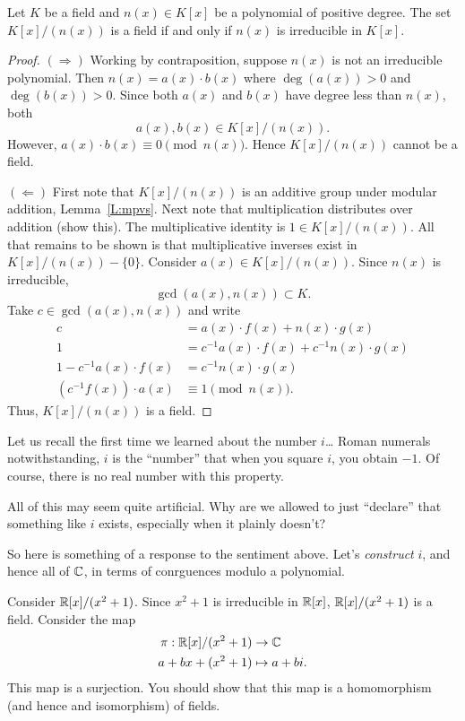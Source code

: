 \documentclass{ximera}
\begin{document}
\begin{theorem}\label{T:cmip}
  Let $K$ be a field and $n(x)\in K[x]$ be a polynomial of positive
  degree. The set $K[x]/(n(x))$ is a field if and only if $n(x)$ is
  irreducible in $K[x]$.
  \begin{proof}
    $(\Rightarrow)$ Working by contraposition, suppose $n(x)$ is not
    an irreducible polynomial. Then $n(x) = a(x)\cdot b(x)$ where
    $\deg(a(x))>0$ and $\deg(b(x))>0$. Since both $a(x)$ and $b(x)$
    have degree less than $n(x)$, both
    \[
    a(x),b(x)\in K[x]/(n(x)).
    \]
    However, $a(x)\cdot b(x) \equiv 0 \pmod{n(x)}$. Hence $K[x]/(n(x))$
    cannot be a field.
    


    $(\Leftarrow)$ First note that $K[x]/(n(x))$ is an additive group
    under modular addition, Lemma~\ref{L:mpvs}. Next note that
    multiplication distributes over addition (show this). The
    multiplicative identity is $1\in K[x]/(n(x))$. All that remains to
    be shown is that multiplicative inverses exist in
    $K[x]/(n(x))-\{0\}$. Consider $a(x)\in K[x]/(n(x))$. Since $n(x)$
    is irreducible,
    \[
    \gcd(a(x),n(x)) \subset K.
    \]
    Take $c\in \gcd(a(x),n(x))$ and write
    \begin{align*}
      c &= a(x) \cdot f(x) + n(x) \cdot g(x) \\
      1 &= c^{-1}a(x) \cdot f(x) + c^{-1}n(x) \cdot g(x) \\
      1 - c^{-1}a(x) \cdot f(x)  &=c^{-1}n(x) \cdot g(x) \\
      (c^{-1} f(x)) \cdot a(x) &\equiv 1 \pmod{n(x)}.
    \end{align*}
    Thus, $K[x]/(n(x))$ is a field.
  \end{proof}
\end{theorem}

Let us recall the first time we learned about the number $i$\dots
Roman numerals notwithstanding, $i$ is the ``number'' that when you
square $i$, you obtain $-1$. Of course, there is no real number with
this property.

All of this may seem quite artificial. Why are we allowed to just
``declare'' that something like $i$ exists, especially when it plainly
doesn't?

So here is something of a response to the sentiment above. Let's
\textit{construct} $i$, and hence all of $\mathbb C$, in terms of conrguences
modulo a polynomial.

\begin{example}
  Consider $\mathbb R[x]/(x^2+1)$. Since $x^2+1$ is irreducible in $\mathbb R[x]$,
  $\mathbb R[x]/(x^2+1)$ is a field. Consider the map
  \begin{align*}
    \pi: \mathbb R[x]/(x^2+1) &\to \mathbb C\\
    a  + bx + (x^2+1) &\mapsto a+ bi.
  \end{align*}
  This map is a surjection. You should show that this map is a
  homomorphism (and hence and isomorphism) of fields.
\end{example}
\end{document}
